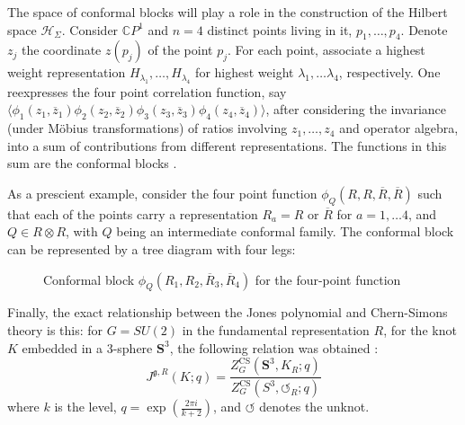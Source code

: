 \documentclass[a4paper,titlepage,twoside]{book}
\begin{document}
The space of conformal blocks will play a role in the construction of the Hilbert space $\mathcal{H}_{\Sigma}$.  Consider $\mathbb{C}P^1$ and $n=4$ distinct points living in it, $p_1, \dots , p_4$.  Denote $z_j$ the coordinate $z{(p_j)}$ of the point $p_j$.  For each point, associate a highest weight representation $H_{\lambda_1}, \dots , H_{\lambda_4}$ for highest weight $\lambda_1, \dots \lambda_4$, respectively.  One reexpresses the four point correlation function, say  $\langle \phi_1(z_1, \overline{z}_1) \phi_2{ (z_2,\overline{z}_2) }\phi_3{ (z_3,\overline{z}_3) }\phi_4{ (z_4,\overline{z}_4) } \rangle$, after considering the invariance (under M\"{o}bius transformations) of ratios involving $z_1, \dots ,z_4$ and operator algebra, into a sum of contributions from different representations.  The functions in this sum are the conformal blocks \cite{DiFrancesco1999}.

As a prescient example, consider the four point function $\phi_Q{ (R,R,\overline{R}, \overline{R})}$ such that each of the points carry a representation $R_a = R$ or $\overline{R}$ for $a= 1, \dots 4$, and $Q \in R \otimes R$, with $Q$ being an intermediate conformal family.  The conformal block can be represented by a tree diagram with four legs:

\begin{figure}[h]
\begin{center}
\end{center}
\caption{Conformal block $\phi_Q{ (R_1, R_2, \overline{R}_3, \overline{R}_4) }$ for the four-point function}
\end{figure}

Finally, the exact relationship between the Jones polynomial and Chern-Simons theory is this: for $G=SU(2)$ in the fundamental representation $R$, for the knot $K$ embedded in a 3-sphere $\mathbf{S}^3$, the following relation was obtained \cite{Witten1989}:
\begin{equation}
J^{\mathfrak{g}, R}{ (K;q) } = \frac{ Z_G^{ \text{CS}}{ (\mathbf{S}^3, K_R;q) } }{ Z^{\text{CS}}_G{ (S^3, \circlearrowleft_R;q) } }  \label{Eq:CStheoryJonespolynomial00}
\end{equation}
where $k$ is the level, $q = \exp{ \left( \frac{2\pi i}{ k + 2} \right) }$, and $\circlearrowleft$ denotes the unknot.  
\end{document}
